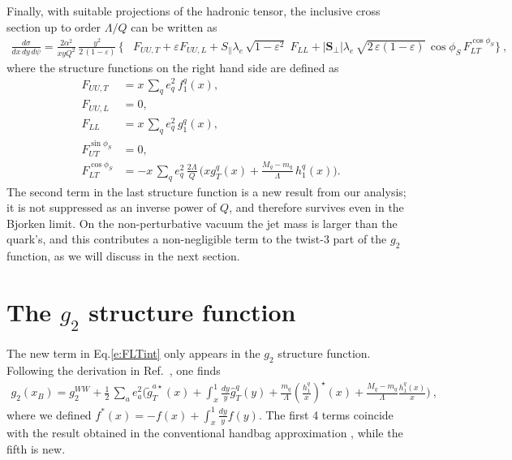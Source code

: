 \documentclass[preprintnumbers,floatfix,nofootinbib]{revtex4}
\newcommand{\xbj}{x}                   %
\newcommand{\mj}{M_q}
\newcommand{\mq}{m_q}
\begin{document}
Finally, with suitable projections of the hadronic tensor, the inclusive cross section up to order $\Lambda/Q$ can be written as
\begin{align}
\frac{d\sigma}{d\xbj \, dy\, d\psi}
=
\frac{2 \alpha^2}{\xbj y Q^2}\,
\frac{y^2}{2\,(1-\varepsilon)}\, 
\biggl\{
&F_{UU ,T} + \varepsilon F_{UU ,L}
+ S_\parallel \lambda_e\,
  \sqrt{1-\varepsilon^2}\; 
F_{LL}
+ |\bm{S}_\perp| \lambda_e\, \sqrt{2\,\varepsilon (1-\varepsilon)}\, 
  \cos\phi_S\, 
F_{LT}^{\cos \phi_S}
 \biggr\} \ ,
\label{e:crossdis}
\end{align}
where the structure functions on the right hand side are defined as
\begin{align}
F_{UU ,T} &= \xbj\,\sum_q e_q^2\,f_1^q(\xbj),
\\
F_{UU ,L} &= 0,
\\
F_{LL} &=\xbj\,\sum_q e_q^2\,g_1^q(\xbj),
\\
F_{UT}^{\sin \phi_S}&=0,
\label{e:FUTint}
\\
F_{LT}^{\cos \phi_S}&=-\xbj\,\sum_q e_q^2\, \frac{2\Lambda}{Q}\,
\biggl(\xbj  g_T^q(\xbj)
   + \frac{\mj -\mq}{\Lambda} \, h_{1}^q(\xbj) \biggr).
\label{e:FLTint}
\end{align}
The second term in the last structure function is a new result from our
analysis; it is not suppressed as an inverse power of $Q$, and therefore
survives even in the Bjorken limit. On the non-perturbative
vacuum the jet mass is larger than the quark's, and this contributes a
non-negligible term to the twist-3 part of the $g_2$ function, as we will
discuss in the next section.  

 

\section{The $g_2$ structure function}

The new term in Eq.\eqref{e:FLTint} only appears in the $g_2$ structure function. Following the derivation in Ref.~\cite{Accardi:2009au}, one finds
\begin{align}
\label{e:g2}
  g_2(x_B) = g_2^{WW} + \frac{1}{2}\,\sum_a e_a^2
\biggl(
    \widetilde g_T^{a \star}(x) 
    + \int_x^1\frac{dy}{y} \widehat{g}_T^q(y) 
    + \frac{\mq}{\Lambda} \left(\frac{h_1^q}{x}\right)^\star(x) 
    + \frac{\mj-\mq}{\Lambda} \frac{h_1^q(x)}{x} 
\Biggr) \ ,
\end{align}
where we defined $f^*(x) = -f(x) + \int_x^1\frac{dy}{y} f(y)$. The first 4
terms coincide with the result obtained in the conventional handbag
approximation \cite{Accardi:2009au}, while the fifth is new. 
\end{document}
